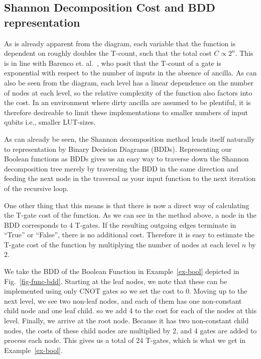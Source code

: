 \subsection{Shannon Decomposition Cost and BDD representation}

As is already apparent from the diagram, each variable that the function is dependent on roughly doubles the T-count, such that the total cost $C \propto 2^n$. This is in line with Barenco et. al.~\cite{bib-barenco-elementary}, who posit that the T-count of a gate is exponential with respect to the number of inputs in the absence of ancilla. As can also be seen from the diagram, each level has a linear dependence on the number of nodes at each level, so the relative complexity of the function also factors into the cost. In an environment where dirty ancilla are assumed to be plentiful, it is therefore desireable to limit these implementations to smaller numbers of input qubits i.e., smaller LUT-sizes.

As can already be seen, the Shannon decomposition method lends itself naturally to representation by Binary Decision Diagrams (BDDs). Representing our Boolean functions as BDDs gives us an easy way to traverse down the Shannon decomposition tree merely by traversing the BDD in the same direction and feeding the next node in the traversal as your input function to the next iteration of the recursive loop.

One other thing that this means is that there is now a direct way of calculating the T-gate cost of the function. As we can see in the method above, a node in the BDD corresponds to 4 T-gates. If the resulting outgoing edges terminate in ``True'' or ``False'', there is no additional cost. Therefore it is easy to estimate the T-gate cost of the function by multiplying the number of nodes at each level $n$ by 2. 

\begin{example}
  \label{ex-cost}
  We take the BDD of the Boolean Function in Example~\ref{ex-bool} depicted in Fig.~\ref{fig-func-bdd}. Starting at the leaf nodes, we note that these can be implemented using only CNOT gates so we set the cost to 0. Moving up to the next level, we see two non-leaf nodes, and each of them has one non-constant child node and one leaf child. so we add 4 to the cost for each of the nodes at this level. Finally, we arrive at the root node. Because it has two non-constant child nodes, the costs of these child nodes are multiplied by 2, and 4 gates are added to process each node. This gives us a total of 24 T-gates, which is what we get in Example~\ref{ex-bool}.
\end{example}


